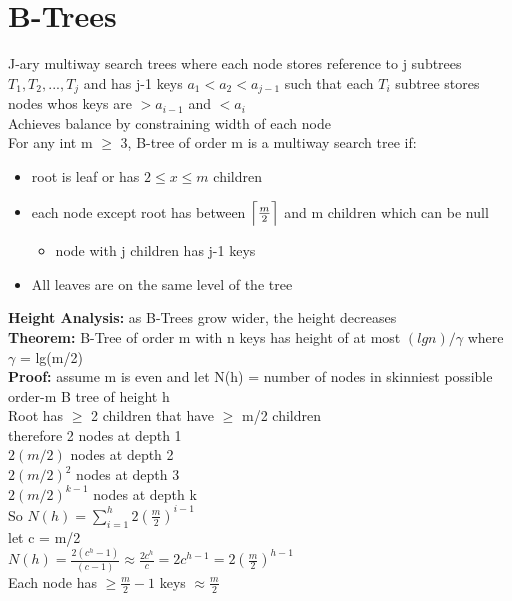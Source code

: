 \documentclass{article}
\DeclarePairedDelimiter{\ceil}{\lceil}{\rceil}
\begin{document}
  \section{B-Trees}
  J-ary multiway search trees where each node stores reference to j subtrees $T_{1}, T_{2}, ..., T_{j}$ and has j-1 keys $a_{1} < a_{2} < a_{j-1}$ such that each $T_{i}$ subtree stores nodes whos keys are $> a_{i-1}$ and $< a_{i}$\\ 
  Achieves balance by constraining width of each node \\
  For any int m $\geq$ 3, B-tree of order m is a multiway search tree if: 
  \begin{itemize}[noitemsep]
  \item root is leaf or has $2 \leq x \leq m$ children
  \item each node except root has between $\ceil[\Big]{\frac{m}{2}}$ and m children which can be null
  \begin{itemize}[noitemsep]
    \item node with j children has j-1 keys
  \end{itemize}
  \item All leaves are on the same level of the tree \\
  \end{itemize}
  \textbf{Height Analysis: }as B-Trees grow wider, the height decreases\\
  \textbf{Theorem: }B-Tree of order m with n keys has height of at most $(lgn)/\gamma$ where $\gamma$ = lg(m/2)\\
  \textbf{Proof: }assume m is even and let N(h) = number of nodes in skinniest possible order-m B tree of height h\\
  \indent Root has $\geq$ 2 children that have $\geq$ m/2 children \\
  \indent \indent therefore 2 nodes at depth 1\\
  \indent \indent $2(m/2)$ nodes at depth 2\\
  \indent \indent $2(m/2)^{2}$ nodes at depth 3\\
  \indent \indent $2(m/2)^{k-1}$ nodes at depth k\\
  \indent So $N(h) = \sum_{i=1}^{h}2(\frac{m}{2})^{i-1}$\\
  \indent let c = m/2\\
  \indent $N(h) = \frac{2(c^{h}-1)}{(c-1)} \approx \frac{2c^{h}}{c} = 2c^{h-1} = 2(\frac{m}{2})^{h-1}$\\
  \indent Each node has $\geq \frac{m}{2}-1$ keys $\approx \frac{m}{2}$\\
\end{document}
